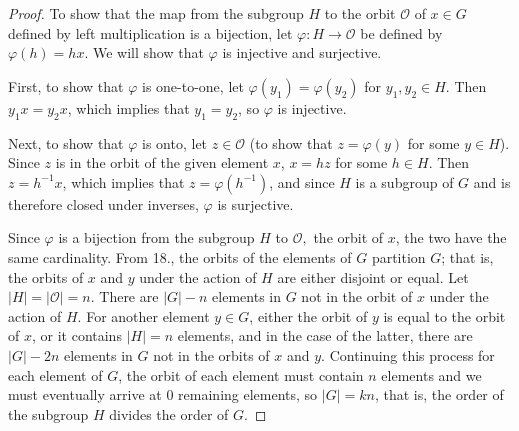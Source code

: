 \documentclass{article}
\begin{document}
\begin{proof}
  To show that the map from the subgroup $H$ to the orbit $\mathcal{O}$ of $x \in G$ defined by left multiplication is a bijection, let $\varphi: H \rightarrow \mathcal{O}$ be defined by $\varphi(h) = hx$. We will show that $\varphi$ is injective and surjective.

  First, to show that $\varphi$ is one-to-one, let $\varphi(y_1) = \varphi(y_2)$ for $y_1, y_2 \in H$. Then $y_1 x = y_2 x$, which implies that $y_1 = y_2$, so $\varphi$ is injective.

  Next, to show that $\varphi$ is onto, let $z \in \mathcal{O}$ (to show that $z = \varphi(y)$ for some $y \in H$). Since $z$ is in the orbit of the given element $x$, $x = hz$ for some $h \in H$. Then $z = h^{-1} x$, which implies that $z = \varphi(h^{-1})$, and since $H$ is a subgroup of $G$ and is therefore closed under inverses, $\varphi$ is surjective.

  Since $\varphi$ is a bijection from the subgroup $H$ to $\mathcal{O},$ the orbit of $x$, the two have the same cardinality. From 18., the orbits of the elements of $G$ partition $G$; that is, the orbits of $x$ and $y$ under the action of $H$ are either disjoint or equal. Let $|H| = |\mathcal{O}| = n$. There are $|G| - n$ elements in $G$ not in the orbit of $x$ under the action of $H$. For another element $y \in G$, either the orbit of $y$ is equal to the orbit of $x$, or it contains $|H| = n$ elements, and in the case of the latter, there are $|G| - 2n$ elements in $G$ not in the orbits of $x$ and $y$. Continuing this process for each element of $G$, the orbit of each element must contain $n$ elements and we must eventually arrive at 0 remaining elements, so $|G| = kn$, that is, the order of the subgroup $H$ divides the order of $G$.
\end{proof}
\end{document}
